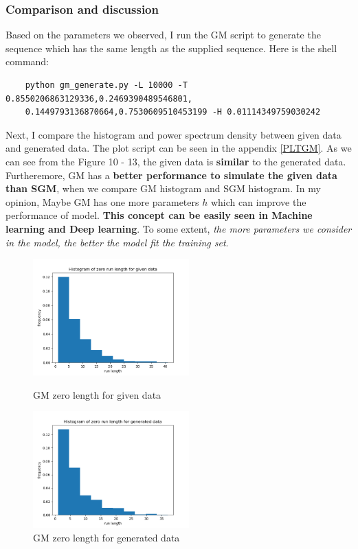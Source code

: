 \documentclass[11pt]{article}
\begin{document}
\subsubsection{Comparison and discussion}
Based on the parameters we observed, I run the GM script to generate the sequence which has the same length as the supplied sequence.
Here is the shell command:
\begin{verbatim}
    python gm_generate.py -L 10000 -T 0.8550206863129336,0.2469390489546801,
    0.1449793136870664,0.7530609510453199 -H 0.01114349759030242
\end{verbatim}
Next, I compare the histogram and power spectrum density between given data and generated data. The plot script can be seen in the appendix \ref{PLTGM}.
As we can see from the Figure 10 - 13, the given data is \textbf{similar} to the generated data. 
Furtheremore, GM has a \textbf{better performance to simulate the given data than SGM}, when we compare GM histogram and SGM histogram.
In my opinion, Maybe GM has one more parameters $h$ which can improve the performance of model.
\textbf{This concept can be easily seen in Machine learning and Deep learning}. To some extent, \emph{the more parameters we consider in the model, the better the model fit the training set}.
\begin{figure}[htbp]
    \centering
    \begin{minipage}[t]{0.48\textwidth}
    \centering
    \includegraphics[width=6cm]{GM_Histogram_of_zero_run_length_for_given_data.png}
    \caption{GM zero length for given data}
    \end{minipage}
    \begin{minipage}[t]{0.48\textwidth}
    \centering
    \includegraphics[width=6cm]{GM_Histogram_of_zero_run_length_for_generated_data.png}
    \caption{GM zero length for generated data}
    \end{minipage}
\end{figure}
\end{document}
